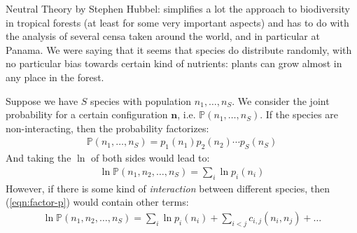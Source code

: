 \documentclass[../../main.tex]{subfiles}
\begin{document}


Neutral Theory by Stephen Hubbel: simplifies a lot the approach to biodiversity in tropical forests (at least for some very important aspects) and has to do with the analysis of several censa taken around the world, and in particular at Panama.
We were saying that it seems that species do distribute randomly, with no particular bias towards certain kind of nutrients: plants can grow almost in any place in the forest.

Suppose we have $S$ species with population $n_1, \dots, n_S$. We consider the joint probability for a certain configuration $\bm{n}$, i.e. $\mathbb{P}(n_1, \dots, n_S)$. If the species are non-interacting, then the probability factorizes:
\begin{align*}
    \mathbb{P}(n_1, \dots, n_S) = p_1(n_1) p_2(n_2) \cdots p_S(n_S)
\end{align*}
And taking the $\ln$ of both sides would lead to:
\begin{align}\label{eqn:factor-p}
    \ln \mathbb{P}(n_1, n_2, \dots, n_S) = \sum_i \ln p_i(n_i)
\end{align}
However, if there is some kind of \textit{interaction} between different species, then (\ref{eqn:factor-p}) would contain other terms:
\begin{align*}
    \ln \mathbb{P}(n_1, n_2, \dots, n_S) = \sum_i \ln p_i(n_i) + \sum_{i < j} c_{i,j}(n_i, n_j) + \dots
\end{align*}
\end{document}
